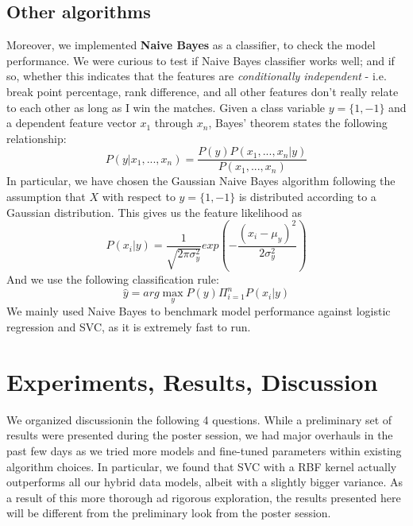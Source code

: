 \documentclass[paper=a4, fontsize=10pt]{scrartcl} %
\numberwithin{equation}{section} %
\numberwithin{figure}{section} %
\numberwithin{table}{section} %
\begin{document}
\subsection{Other algorithms}
Moreover, we implemented \textbf{Naive Bayes} as a classifier, to check the model performance. We were curious to test if Naive Bayes classifier works well; and if so, whether this indicates that the features are \textit{conditionally independent} - i.e. break point percentage, rank difference, and all other features don't really relate to each other as long as I win the matches. Given a class variable $y = \{1,-1\}$  and a dependent feature vector $x_1$ through $x_n$, Bayes' theorem states the following relationship: $$P(y|x_1,...,x_n) = \frac{P(y)P(x_1,...,x_n|y)}{P(x_1,...,x_n)}$$ In particular, we have chosen the Gaussian Naive Bayes algorithm following the assumption that $X$ with respect to $y = \{1,-1\}$ is distributed according to a Gaussian distribution. This gives us the feature likelihood as $$P(x_i | y) = \frac{1}{\sqrt{2\pi \sigma_y^2}} exp(-\frac{(x_i - \mu_y)^2}{2\sigma_y^2})$$
And we use the following classification rule:
$$\hat{y} = arg \max_y P(y) \Pi_{i=1}^n P(x_i | y)$$
We mainly used Naive Bayes to benchmark model performance against logistic regression and SVC, as it is extremely fast to run.


\section{Experiments, Results, Discussion}
We organized discussionin the following 4 questions. While a preliminary set of results were presented during the poster session, we had major overhauls in the past few days as we tried more models and fine-tuned parameters within existing algorithm choices. In particular, we found that SVC with a RBF kernel actually outperforms all our hybrid data models, albeit with a slightly bigger variance. As a result of this more thorough ad rigorous exploration, the results presented here will be different from the preliminary look from the poster session.  
\end{document}
